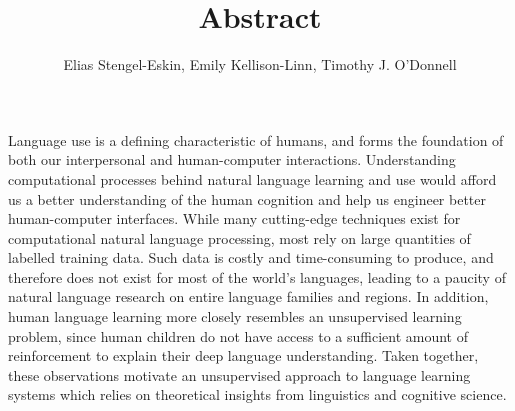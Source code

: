 \documentclass[12pt,letterpaper]{article}
\title{\vspace{-1.5cm} Abstract}
\author{Elias Stengel-Eskin, Emily Kellison-Linn, Timothy J. O'Donnell}
\newif\ifcomments
\newcommand{\cm}[1]{\textcolor{purple}{\ifcomments[COMMENT: #1]\else\fi}}
\begin{document}
\maketitle
Language use is a defining characteristic of humans, and forms the foundation of both our interpersonal and human-computer interactions.  Understanding computational processes behind natural language learning and use would afford us a better understanding of the human cognition and help us engineer better human-computer interfaces. While many cutting-edge techniques exist for computational natural language processing, most rely on large quantities of labelled training data.\cm{This is not strictly true. It is definitely true for most of the deep-learning and NN-based approaches, and some of the statistical ones. I would relativize this comment a bit. } Such data is costly and time-consuming to produce, and therefore does not exist for most of the world's languages, leading to a paucity of natural language research on entire language families and regions.\cm{Again, this is a fair point but impresice. Much of the NN based data is not that costly to produce since it is just text or recorded speech, the labeled stuff is costly of course. But there are two issues: labeled stuff is costly, but even unlabeled stuff is rare for certain languages and tasks.}
In addition, human language learning more closely resembles an unsupervised learning problem\cm{I think it is fair to say that human learning is unsupervised in the ML sense.}, since human children do not have access to a sufficient amount of reinforcement to explain their deep language understanding\cm{I believe that this statement is true, but it is dangerous ground---its the kind of thing that more empiricist types take issue at and better to avoid staking claims like this. Everyone can agree that unsupervised learning is good, whether or not the amount of training data or reinforcement that kids receive is sufficient according to whatever criterior to learn whatever phenomena. }. Taken together, these observations motivate an unsupervised approach to language learning systems which relies on theoretical insights from linguistics and cognitive science.\cm{In an abstract, you can be more terse than the above. I would cut this down by about half. Just assert the problems with supervised approaches and the advantages of unsupervised learning. You also need to get to the actual thing we are doing by the end of the first paragraph---i.e., unsupervised learning of linguistic structure (phonemes, morphemes, words, sentence structures) directly from acoustic data} \\
\end{document}
